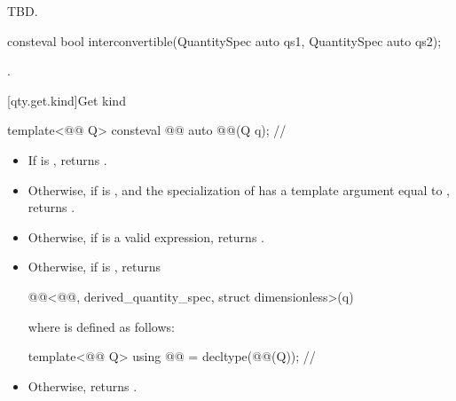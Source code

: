 \begin{itemdescr}
\pnum
\returns
TBD.
\end{itemdescr}

\begin{itemdecl}
consteval bool interconvertible(QuantitySpec auto qs1, QuantitySpec auto qs2);
\end{itemdecl}

\begin{itemdescr}
\pnum
\returns
{}.
\end{itemdescr}

[qty.get.kind]{Get kind}

\begin{itemdecl}
template<@@ Q>
consteval @@ auto @@(Q q);  // \expos
\end{itemdecl}

\begin{itemdescr}
\pnum
\returns
\begin{itemize}
\item
If  is ,
returns .
\item
Otherwise, if
is , and
the specialization of  has a template argument equal to ,
returns .
\item
Otherwise, if  is a valid expression,
returns .
\item
Otherwise, if  is ,
returns
\begin{codeblock}
@@<@@, derived_quantity_spec, struct dimensionless>(q)
\end{codeblock}
where  is defined as follows:
\begin{codeblock}
template<@@ Q>
using @@ = decltype(@@(Q{}));  // \expos
\end{codeblock}
\item
Otherwise, returns .
\end{itemize}
\end{itemdescr}

